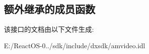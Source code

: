 \subsection*{额外继承的成员函数}


该接口的文档由以下文件生成\+:\begin{DoxyCompactItemize}
\item 
E\+:/\+React\+O\+S-\/0../sdk/include/dxsdk/amvideo.\+idl\end{DoxyCompactItemize}
